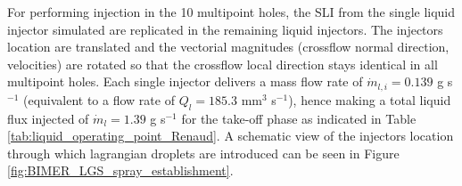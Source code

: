 

For performing injection in the 10 multipoint holes, the SLI from the single liquid injector simulated are replicated in the remaining liquid injectors. The injectors location are translated and the vectorial magnitudes (crossflow normal direction, velocities) are rotated so that the crossflow local direction stays identical in all multipoint holes. Each single injector delivers a mass flow rate of $\dot{m}_{l,i} = 0.139$ g s$^{-1}$ (equivalent to a flow rate of $Q_l = 185.3$ mm$^3$ s$^{-1}$), hence making a total liquid flux injected of $\dot{m}_{l} = 1.39$ g s$^{-1}$ for the take-off phase as indicated in Table \ref{tab:liquid_operating_point_Renaud}. A schematic view of the injectors location through which lagrangian droplets are introduced can be seen in Figure \ref{fig:BIMER_LGS_spray_establishment}.


